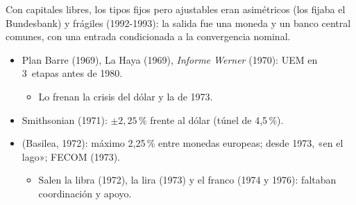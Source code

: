 \documentclass{article}
\begin{document}
\begin{columnas}
\begin{ideaclave}
Con capitales libres, los tipos fijos pero ajustables eran asimétricos (los fijaba el Bundesbank) y frágiles (1992-1993): la salida fue una moneda y un banco central comunes, con una entrada condicionada a la convergencia nominal.
\end{ideaclave}

\begin{itemize}
\item Plan Barre (1969), La Haya (1969), \emph{Informe Werner} (1970): UEM en 3~etapas antes de 1980.
  \begin{itemize}
  \item Lo frenan la crisis del dólar y la de 1973.
  \end{itemize}
\item Smithsonian (1971): $\pm2{,}25$\,\% frente al dólar (túnel de 4,5\,\%).
\item {} (Basilea, 1972): máximo 2,25\,\% entre monedas europeas; desde 1973, «en el lago»; FECOM (1973).
  \begin{itemize}
  \item Salen la libra (1972), la lira (1973) y el franco (1974 y 1976): faltaban coordinación y apoyo.
  \end{itemize}
\end{itemize}


\end{columnas}
\end{document}
